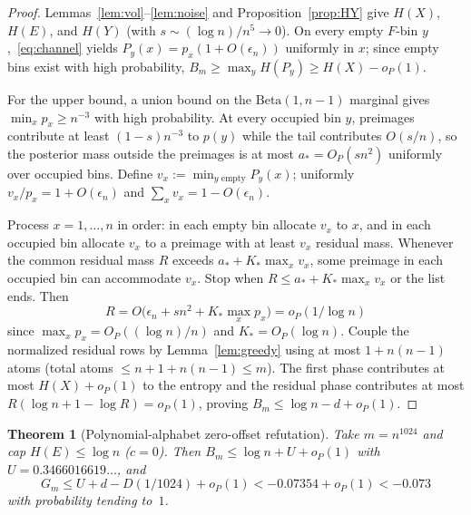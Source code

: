 \documentclass[11pt]{article}
\theoremstyle{plain}
\newtheorem{theorem}{Theorem}
\theoremstyle{definition}
\theoremstyle{remark}
\begin{document}
\begin{proof}
Lemmas~\ref{lem:vol}--\ref{lem:noise} and Proposition~\ref{prop:HY} give $H(X)$, $H(E)$, and $H(Y)$ (with $s \sim (\log n)/n^5 \to 0$). On every empty $F$-bin $y$,~\eqref{eq:channel} yields $P_y(x) = p_x(1 + O(\epsilon_n))$ uniformly in $x$; since empty bins exist with high probability, $B_m \ge \max_y H(P_y) \ge H(X) - o_P(1)$.

For the upper bound, a union bound on the $\mathrm{Beta}(1, n-1)$ marginal gives $\min_x p_x \ge n^{-3}$ with high probability. At every occupied bin $y$, preimages contribute at least $(1 - s)n^{-3}$ to $p(y)$ while the tail contributes $O(s/n)$, so the posterior mass outside the preimages is at most $a_* = O_P(s n^2)$ uniformly over occupied bins. Define $v_x := \min_{y \text{ empty}} P_y(x)$; uniformly $v_x / p_x = 1 + O(\epsilon_n)$ and $\sum_x v_x = 1 - O(\epsilon_n)$.

Process $x = 1, \dots, n$ in order: in each empty bin allocate $v_x$ to $x$, and in each occupied bin allocate $v_x$ to a preimage with at least $v_x$ residual mass. Whenever the common residual mass $R$ exceeds $a_* + K_* \max_x v_x$, some preimage in each occupied bin can accommodate $v_x$. Stop when $R \le a_* + K_* \max_x v_x$ or the list ends. Then
\[
R = O\bigl(\epsilon_n + sn^2 + K_* \max_x p_x\bigr) = o_P(1/\log n)
\]
since $\max_x p_x = O_P((\log n)/n)$ and $K_* = O_P(\log n)$. Couple the normalized residual rows by Lemma~\ref{lem:greedy} using at most $1 + n(n-1)$ atoms (total atoms $\le n + 1 + n(n-1) \le m$). The first phase contributes at most $H(X) + o_P(1)$ to the entropy and the residual phase contributes at most $R(\log n + 1 - \log R) = o_P(1)$, proving $B_m \le \log n - d + o_P(1)$.
\end{proof}

\begin{theorem}[Polynomial-alphabet zero-offset refutation]\label{thm:poly}
Take $m = n^{1024}$ and cap $H(E) \le \log n$ ($c = 0$). Then $B_m \le \log n + U + o_P(1)$ with $U = 0.3466016619\dots$, and
\[
G_m \le U + d - D(1/1024) + o_P(1) < -0.07354 + o_P(1) < -0.073
\]
with probability tending to~$1$.
\end{theorem}
\end{document}
